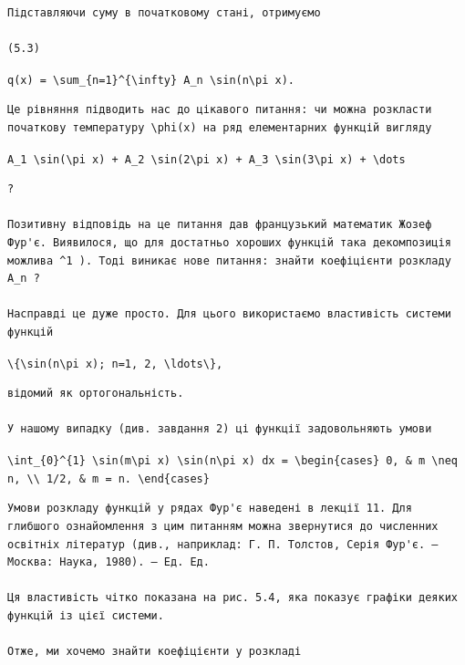 \documentclass[
  ukrainian,
]{article}
\begin{document}
\begin{verbatim}
Підставляючи суму в початковому стані, отримуємо

(5.3)
\end{verbatim}

\texttt{q(x)\ =\ \textbackslash{}sum\_\{n=1\}\^{}\{\textbackslash{}infty\}\ A\_n\ \textbackslash{}sin(n\textbackslash{}pi\ x).}

\begin{verbatim}
Це рівняння підводить нас до цікавого питання: чи можна розкласти початкову температуру \phi(x) на ряд елементарних функцій вигляду
\end{verbatim}

\texttt{A\_1\ \textbackslash{}sin(\textbackslash{}pi\ x)\ +\ A\_2\ \textbackslash{}sin(2\textbackslash{}pi\ x)\ +\ A\_3\ \textbackslash{}sin(3\textbackslash{}pi\ x)\ +\ \textbackslash{}dots}

\begin{verbatim}
?

Позитивну відповідь на це питання дав французький математик Жозеф Фур'є. Виявилося, що для достатньо хороших функцій така декомпозиція можлива ^1 ). Тоді виникає нове питання: знайти коефіцієнти розкладу A_n ?

Насправді це дуже просто. Для цього використаємо властивість системи функцій
\end{verbatim}

\texttt{\textbackslash{}\{\textbackslash{}sin(n\textbackslash{}pi\ x);\ n=1,\ 2,\ \textbackslash{}ldots\textbackslash{}\},}

\begin{verbatim}
відомий як ортогональність.

У нашому випадку (див. завдання 2) ці функції задовольняють умови
\end{verbatim}

\texttt{\textbackslash{}int\_\{0\}\^{}\{1\}\ \textbackslash{}sin(m\textbackslash{}pi\ x)\ \textbackslash{}sin(n\textbackslash{}pi\ x)\ dx\ =\ \textbackslash{}begin\{cases\}\ 0,\ \&\ m\ \textbackslash{}neq\ n,\ \textbackslash{}\textbackslash{}\ 1/2,\ \&\ m\ =\ n.\ \textbackslash{}end\{cases\}}

\begin{verbatim}
Умови розкладу функцій у рядах Фур'є наведені в лекції 11. Для глибшого ознайомлення з цим питанням можна звернутися до численних освітніх літератур (див., наприклад: Г. П. Толстов, Серія Фур'є. — Москва: Наука, 1980). — Ед. Ед.

Ця властивість чітко показана на рис. 5.4, яка показує графіки деяких функцій із цієї системи.

Отже, ми хочемо знайти коефіцієнти у розкладі
\end{verbatim}
\end{document}
